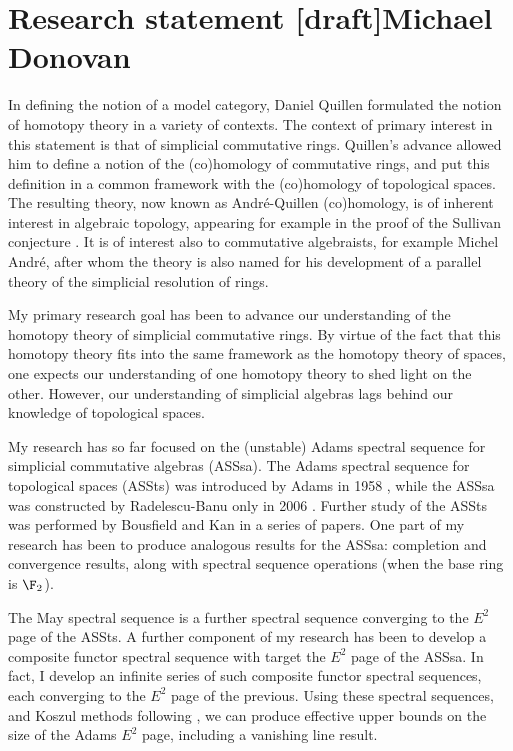 \documentclass[11pt]{article}
\begin{document}
\section*{\huge Research statement [draft]\hfill\normalsize Michael Donovan} 

In defining the notion of a model category, Daniel Quillen \cite{QuillenHomAlg.pdf} formulated the notion of homotopy theory in a variety of contexts. The context of primary interest in this statement is that of simplicial commutative rings. Quillen's advance allowed him to define a notion of the (co)homology of commutative rings, and put this definition in a common framework with the (co)homology of topological spaces. The resulting theory, now known as Andr\'e-Quillen (co)homology, is of inherent interest in algebraic topology, appearing for example in the proof of the Sullivan conjecture \cite{MillerSullivanConjecture.pdf}. It is of interest also to commutative algebraists, for example Michel Andr\'e, after whom the theory is also named for his development of a parallel theory of the simplicial resolution of rings.

My primary research goal has been to advance our understanding of the homotopy theory of simplicial commutative rings. By virtue of the fact that this homotopy theory fits into the same framework as the homotopy theory of spaces, one expects our understanding of one homotopy theory to shed light on the other. However, our understanding of simplicial algebras lags behind our knowledge of topological spaces.

My research has so far focused on the (unstable) Adams spectral sequence for simplicial commutative algebras (ASSsa). The Adams spectral sequence for topological spaces (ASSts) was introduced by Adams in 1958 \cite{MR0096219}, while the ASSsa was constructed by Radelescu-Banu only in 2006 \cite{radelescuBanu.pdf}. Further study of the ASSts was performed by Bousfield and Kan in a series \cite{BousKanSSeq.pdf,BK_pairings.pdf,BK_pairings_products.pdf} of papers. One part of my research has been to produce analogous results for the ASSsa: completion and convergence results, along with spectral sequence operations (when the base ring is $\F_2$).

The May spectral sequence \cite{MayRestLie.pdf} is a further spectral sequence converging to the $E^2$ page of the ASSts. A further component of my research has been to develop a composite functor spectral sequence with target the $E^2$ page of the ASSsa. In fact, I develop an infinite series of such composite functor spectral sequences, each converging to the $E^2$ page of the previous. Using these spectral sequences, and Koszul methods following \cite{PriddyKoszul.pdf}, we can produce effective upper bounds on the size of the Adams $E^2$ page, including a vanishing line result.
\end{document}
